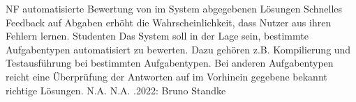 \begin{myreq}
    \threeinline
    {\reqno}
    {\reqtype NF}
    {}
    \reqdesc automatisierte Bewertung von im System abgegebenen Lösungen
    \reqrat Schnelles Feedback auf Abgaben erhöht die Wahrscheinlichkeit, dass Nutzer aus ihren Fehlern lernen.
    \reqorig Studenten
    \reqfit Das System soll in der Lage sein, bestimmte Aufgabentypen automatisiert zu bewerten. Dazu gehören z.B. Kompilierung und Testausführung bei bestimmten Aufgabentypen. Bei anderen Aufgabentypen reicht eine Überprüfung der Antworten auf im Vorhinein gegebene bekannt richtige Lösungen.
    \twoinline
    {}
    {}
    \twoinline
    {}
    {\reqconf N.A.}
    \reqmater N.A.
    .2022: Bruno Standke
\end{myreq}